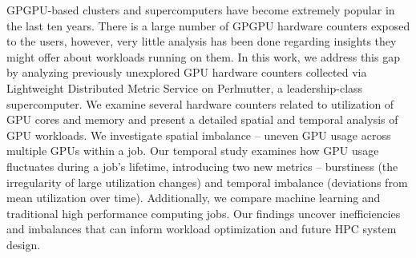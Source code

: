 GPGPU-based clusters and supercomputers have become extremely popular in the
last ten years. There is a large number of GPGPU hardware counters exposed to
the users, however, very little analysis has been done regarding insights they
might offer about workloads running on them.  In this work, we address this gap
by analyzing previously unexplored GPU hardware counters collected via
Lightweight Distributed Metric Service on Perlmutter, a leadership-class
supercomputer. We examine several hardware counters related to utilization of
GPU cores and memory and present a detailed spatial and temporal analysis of
GPU workloads.  We investigate spatial imbalance -- uneven GPU usage across
multiple GPUs within a job.  Our temporal study examines how GPU usage
fluctuates during a job’s lifetime, introducing two new metrics -- burstiness
(the irregularity of large utilization changes) and temporal imbalance
(deviations from mean utilization over time). Additionally, we compare machine
learning and traditional high performance computing jobs.  Our findings uncover
inefficiencies and imbalances that can inform workload optimization and future
HPC system design.
